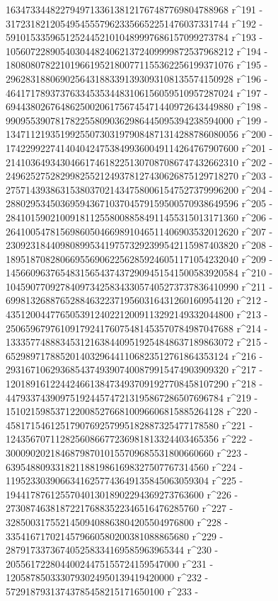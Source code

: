        163473344822794971336138121767487769804788968 r^191 - 
       317231821205495455579623356652251476037331744 r^192 - 
       591015335965125244521010489997686157099273784 r^193 - 
       1056072289054030448240621372409999872537968212 r^194 - 
       1808080782210196619521800771155362256199371076 r^195 - 
       2962831880690256431883391393093108135574150928 r^196 - 
       4641717893737633453534483106156059510957287024 r^197 - 
       6944380267648625002061756745471440972643449880 r^198 - 
       9909553907817822558090362986445095394238594000 r^199 - 
       13471121935199255073031979084871314288786080056 r^200 - 
       17422992274140404247538499360049114264767907600 r^201 - 
       21410364934304661746182251307087086747432662310 r^202 - 
       24962527528299825521249378127430626875129718270 r^203 - 
       27571439386315380370214347580061547527379996200 r^204 - 
       28802953450369594367103704579159500570938649596 r^205 - 
       28410159021009181125580088584911455315013171360 r^206 - 
       26410054781569860504669891046511406903532012620 r^207 - 
       23092318440980899534197573292399542115987403820 r^208 - 
       18951870828066955690622562859246051171054232040 r^209 - 
       14566096376548315654374372909451541500583920584 r^210 - 
       10459077092784097342583433057405273737836410990 r^211 - 
       6998132688765288463223719560316431260160954120 r^212 - 
       4351200447765053912402212009113292149332044800 r^213 - 
       2506596797610917924176075481453570784987047688 r^214 - 
       1333577488834531216384409519254848637189863072 r^215 - 
       652989717885201403296441106823512761864353124 r^216 - 
       293167106293685437493907400879915474903909320 r^217 - 
       120189161224424661384734937091927708458107290 r^218 - 
       44793374390975192445747213195867286507696784 r^219 - 
       15102159853712200852766810096606815885264128 r^220 - 
       4581715461251790769257995182887325477178580 r^221 - 
       1243567071128256086677236981813324403465356 r^222 - 
       300090202184687987010155709685531800660660 r^223 - 
       63954880933182118819861698327507767314560 r^224 - 
       11952330390663416257743649135845063059304 r^225 - 
       1944178761255704013018902294369273763600 r^226 - 
       273087463818722176883522346516476285760 r^227 - 
       32850031755214509408863804205504976800 r^228 - 
       3354167170214579660580200381088865680 r^229 - 
       287917337367405258334169585963965344 r^230 - 
       20556172280440024475155724159547000 r^231 - 
       1205878503330793024950139419420000 r^232 - 
       57291879313743785458215171650100 r^233 - 
